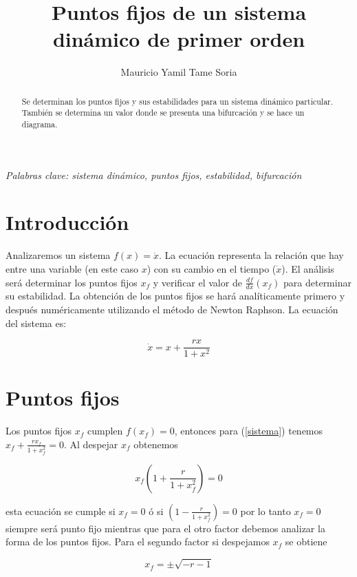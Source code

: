\documentclass[10pt]{article}
\begin{document}
\title{Puntos fijos de un sistema din\'amico de primer orden}
\author{Mauricio Yamil Tame Soria}
\maketitle

\begin{abstract}
Se determinan los puntos fijos y sus estabilidades para un sistema din\'amico particular. Tambi\'en se determina un valor donde se presenta 
una bifurcaci\'on y se hace un diagrama.
\end{abstract}

\emph{Palabras clave: sistema din\'amico, puntos fijos, estabilidad, bifurcaci\'on}

\section{Introducci\'on}
Analizaremos un sistema $f(x)=\dot{x}$. La ecuaci\'on representa la relaci\'on que hay entre una variable (en este caso $x$) con su cambio en 
el tiempo ($\dot{x}$). El an\'alisis ser\'a determinar los puntos fijos $x_f$ y 
verificar el valor de $\frac{df}{dx}(x_f)$ para determinar su 
estabilidad. La obtenci\'on de los puntos fijos se har\'a anal\'iticamente primero y despu\'es num\'ericamente utilizando el m\'etodo de 
Newton Raphson. La ecuaci\'on del sistema es:

\begin{equation}
	\dot{x}=x+\frac{rx}{1+x^2}
\label{sistema}
\end{equation}

\section{Puntos fijos}
Los puntos fijos $x_f$ cumplen $f(x_f)=0$, entonces para (\ref{sistema}) tenemos 
$x_f+\frac{rx_f}{1+x_f^2}=0$. Al despejar $x_f$ obtenemos

\begin{equation}
	x_f(1+\frac{r}{1+x_f^2})=0	
\label{puntosfijos}
\end{equation}

esta ecuaci\'on se cumple si $x_f=0$ \'o si $(1-\frac{r}{1+x_f^2})=0$ por lo 
tanto 
$x_f=0$ siempre ser\'a punto fijo mientras que para el otro 
factor debemos analizar la forma de los puntos fijos. Para el segundo factor si despejamos $x_f$ se obtiene

\begin{equation}
	x_f=\pm\sqrt{-r-1}
\label{factor}
\end{equation}
\end{document}
